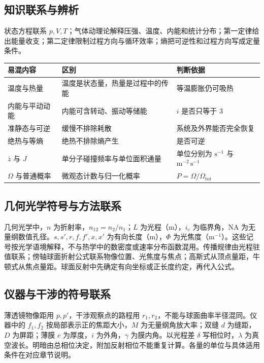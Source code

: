 \documentclass[UTF8,fontset=none,zihao=-4,a4paper]{ctexart}
\begin{document}
\subsection{知识联系与辨析}
状态方程联系 $p,V,T$；气体动理论解释压强、温度、内能和统计分布；第一定律给出能量收支；第二定律限制过程方向与循环效率；熵把可逆性和过程方向写成定量条件。
\begin{center}
\begin{tabularx}{\linewidth}{l Y Y}
\toprule
易混内容 & 区别 & 判断依据\\
\midrule
温度与热量 & 温度是状态量，热量是过程中的传能 & 等温膨胀仍可吸热\\
内能与平动动能 & 内能可含转动、振动等储能 & $i$ 是否只等于 3\\
准静态与可逆 & 缓慢不排除耗散 & 系统及外界能否完全恢复\\
绝热与等熵 & 绝热不排除熵产生 & 是否可逆\\
$\bar z$ 与 $J$ & 单分子碰撞频率与单位面积通量 & 单位分别为 $\mathrm{s^{-1}}$ 与 $\mathrm{m^{-2}\,s^{-1}}$\\
$\Omega$ 与普通概率 & 微观态计数与归一化概率 & $P=\Omega/\Omega_{\mathrm{tot}}$\\
\bottomrule
\end{tabularx}
\end{center}

\subsection{几何光学符号与方法联系}
几何光学中，$n$ 为折射率，$n_{12}=n_2/n_1$；$L$ 为光程（m），$i_{\mathrm c}$ 为临界角，NA 为无量纲数值孔径。$s,s',r,f,f',x,x'$ 为有向长度（m），$\Phi$ 为光焦度（$\mathrm{m^{-1}}$）。这些记号按光学语境解释，不与热学中的数密度或速率分布函数混用。传播规律由光程驻值联系；傍轴球面折射公式联系物像位置、光焦度与焦点；高斯式从顶点量距，牛顿式从焦点量距。球面反射中先确定有向坐标或正长度约定，再代入公式。

\subsection{仪器与干涉的符号联系}
薄透镜物像距用 $p,p'$，干涉观察点的路程用 $r_1,r_2$，不能与球面曲率半径混同。仪器中的 $f_1,f_2$ 按局部表示正的焦距大小，$M$ 为无量纲角放大率；双缝 $d$ 为缝距，$D$ 为屏距；薄膜 $e$ 为厚度，$i$ 为外角，$\gamma$ 为膜内角。以光程差 $\delta$ 写相位时，$\lambda$ 为真空波长。明暗由总相位决定，附加反射相位不能重复计算。各量的单位与具体适用条件在对应章节说明。
\end{document}
